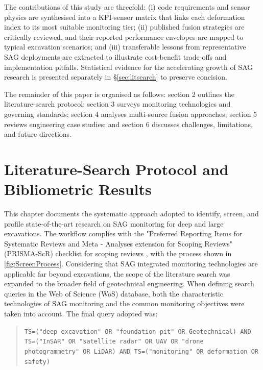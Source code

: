\documentclass[preprint,11pt,authoryear,3p]{elsarticle}
\begin{document}
The contributions of this study are threefold:  
(i) code requirements and sensor physics are synthesised into a KPI-sensor matrix that links each deformation index to its most suitable monitoring tier;  
(ii) published fusion strategies are critically reviewed, and their reported performance envelopes are mapped to typical excavation scenarios; and  
(iii) transferable lessons from representative SAG deployments are extracted to illustrate cost-benefit trade-offs and implementation pitfalls. Statistical evidence for the accelerating growth of SAG research is presented separately in \S\ref{sec:litsearch} to preserve concision.

The remainder of this paper is organised as follows: section 2 outlines the literature-search protocol; section 3 surveys monitoring technologies and governing standards; section 4 analyses multi-source fusion approaches; section 5 reviews engineering case studies; and section 6 discusses challenges, limitations, and future directions.

\section{Literature-Search Protocol and Bibliometric Results}

This chapter documents the systematic approach adopted to identify, screen, and profile state-of-the-art research on SAG monitoring for deep and large excavations. The workflow complies with the "Preferred Reporting Items for Systematic Reviews and Meta - Analyses extension for Scoping Reviews" (PRISMA-ScR) checklist for scoping reviews \citep{PRISMA-ScR}, with the process shown in \autoref{fig:ScreenProcess}.
Considering that SAG integrated monitoring technologies are applicable far beyond excavations, the scope of the literature search was expanded to the broader field of geotechnical engineering. When defining search queries in the Web of Science (WoS) database, both the characteristic technologies of SAG monitoring and the common monitoring objectives were taken into account. The final query adopted was: 

\begin{quote}
\texttt{TS=("deep excavation" OR "foundation pit" OR Geotechnical) AND
TS=("InSAR" OR "satellite radar" OR UAV OR "drone photogrammetry" OR LiDAR) AND
TS=("monitoring" OR deformation OR safety)}
\end{quote}
\end{document}
